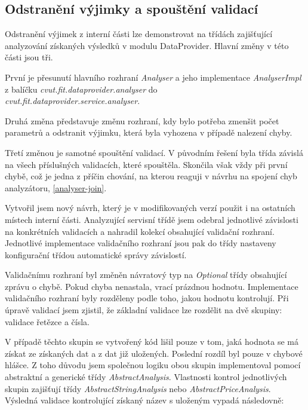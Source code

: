 \documentclass[thesis=B,czech]{FITthesis}[2012/06/26]
\begin{document}
\subsection{Odstranění výjimky a spouštění validací}
Odstranění výjimek z interní části lze demonstrovat na třídách zajišťující analyzování získaných výsledků v modulu DataProvider. Hlavní změny v této části jsou tři.
\par
První je přesunutí hlavního rozhraní \textit{Analyser} a jeho implementace
\textit{AnalyserImpl} z balíčku \textit{cvut.fit.dataprovider.analyser} 
do  \\
\textit{cvut.fit.dataprovider.service.analyser}. 
\par
Druhá změna představuje změnu rozhraní, kdy bylo potřeba
zmenšit počet parametrů a odstranit výjimku, která byla vyhozena v případě nalezení chyby. 
\par
Třetí změnou je samotné spouštění validací. V původním řešení byla třída závislá na všech příslušných validacích, které spouštěla.
Skončila však vždy při první chybě, což je jedna 
z příčin chování, na kterou reaguji v návrhu na spojení chyb analyzátoru, \ref{analyser-join}.
\par
Vytvořil jsem nový návrh, který je v modifikovaných verzí použit i na ostatních místech interní části. Analyzující servisní třídě jsem odebral jednotlivé závislosti na konkrétních validacích a nahradil kolekcí obsahující validační rozhraní. Jednotlivé implementace validačního rozhraní jsou pak do třídy nastaveny konfigurační třídou automatické správy závislostí.
\par
Validačnímu rozhraní byl změněn návratový typ na \textit{Optional} třídy obsahující zprávu o chybě. Pokud chyba nenastala, vrací
prázdnou hodnotu. Implementace validačního rozhraní byly rozděleny podle toho, jakou hodnotu kontrolují.
Při úpravě validací jsem zjistil, že základní validace lze rozdělit na dvě skupiny: validace řetězce a čísla.
\par
V případě těchto skupin se vytvořený kód lišil pouze v tom, jaká hodnota se má získat ze získaných dat a z dat již uložených.
Poslední rozdíl byl pouze v chybové hlášce. Z toho důvodu jsem společnou logiku obou skupin implementoval
pomocí abstraktní a generické třídy \textit{AbstractAnalysis}. Vlastnosti kontrol jednotlivých skupin zajišťují třídy \textit{AbstractStringAnalysis} 
nebo \textit{AbstractPriceAnalysis}. Výsledná validace kontrolující získaný název s uloženým vypadá následovně:
\end{document}
